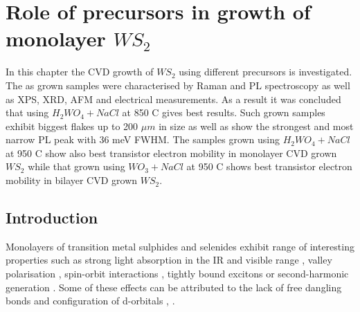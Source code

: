 \chapter{Role of precursors in growth of monolayer $WS_2$}

In this chapter the CVD growth of $WS_2$ using different precursors is investigated. The as grown samples were characterised by Raman and PL spectroscopy as well as XPS, XRD, AFM and electrical measurements. As a result it was concluded that using $H_2WO_4 + NaCl$ at 850 {\degree}C gives best results. Such grown samples exhibit biggest flakes up to 200 $\mu m$ in size as well as show the strongest and most narrow PL peak with 36 meV FWHM. The samples grown using $H_2WO_4 + NaCl$ at 950 {\degree}C show also best transistor electron mobility in monolayer CVD grown $WS_2$ while that grown using $WO_3 + NaCl$ at 950 {\degree}C shows best transistor electron mobility in bilayer CVD grown $WS_2$. 

\section{Introduction}
	
Monolayers of transition metal sulphides and selenides exhibit range of interesting properties such as strong light absorption in the IR and visible range \cite{AtomicallyThinMoS2ANewDirect-GapSemiconductor}\cite{ExtraordinarySunlightAbsorptionAndOneNanometerThickPhotovoltaicsUsingTwo-DimensionalMonolayerMaterials}\cite{EvolutionOfElectronicStructureInAtomicallyThinSheetsOfWS2AndWSe2}, valley polarisation \cite{ControlOfValleyPolarizationInMonolayerMoS2ByOpticalHelicity} \cite{ValleyPolarizationInMoS2MonolayersByOpticalPumping}, spin-orbit interactions \cite{CoupledSpinAndValleyPhysicsInMonolayersOfMoS2AndOtherGroup-VIDichalcogenides}\cite{GiantSpin-orbit-inducedSpinSplittingInTwo-dimensionalTransition-metalDichalcogenideSemiconductors}, tightly bound excitons \cite{TightlyBoundTrionsInMonolayer} or second-harmonic generation \cite{ProbingSymmetryPropertiesOfFew-LayerMoS2Andh-BNByOpticalSecond-HarmonicGeneration}. Some of these effects can be attributed to the lack of free dangling bonds and configuration of d-orbitals \cite{TheTransitionMetalDichalcogenidesDiscussionAndInterpretationOfTheObservedOpticalElectricalAndStructuralProperties}, \cite{ElectronicPropertiesOfMoS2Nanoparticles}.

